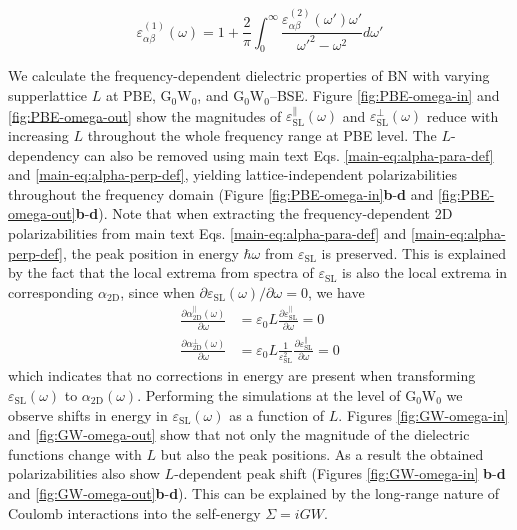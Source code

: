 \documentclass[manuscript=suppinfo,email=true,hyperref=true,keywords=false]{achemso}
\begin{document}
\begin{equation}
  \varepsilon_{\alpha\beta}^{(1)}(\omega)=1+\frac{2}{\pi}\int_0^\infty\frac{\varepsilon_{\alpha\beta}^{(2)}(\omega')\omega'}{\omega'^2-\omega^2}d\omega'
\end{equation}

We calculate the frequency-dependent dielectric properties of BN with
varying supperlattice $L$ at PBE, G$_{0}$W$_{0}$, and G$_{0}$W$_{0}$--BSE. 
Figure \ref{fig:PBE-omega-in} and \ref{fig:PBE-omega-out} show the
magnitudes of $\varepsilon_{\mathrm{SL}}^{\parallel}(\omega)$ and
$\varepsilon_{\mathrm{SL}}^{\perp}(\omega)$ reduce with increasing $L$
throughout the whole frequency range at PBE level. The $L$-dependency can also be
removed using main text Eqs. \ref{main-eq:alpha-para-def} and
\ref{main-eq:alpha-perp-def}, yielding lattice-independent
polarizabilities throughout the frequency domain (Figure \ref{fig:PBE-omega-in}{\bf b}-{\bf d} and \ref{fig:PBE-omega-out}{\bf b}-{\bf d}). 
%
Note that when extracting the frequency-dependent 2D polarizabilities
from main text Eqs. \ref{main-eq:alpha-para-def} and
\ref{main-eq:alpha-perp-def}, the peak position in energy
$\hbar \omega$ from $\varepsilon_{\mathrm{SL}}$ is preserved. This is
explained by the fact that the local extrema from spectra of
$\varepsilon_{\mathrm{SL}}$ is also the local extrema in corresponding
$\alpha_{\mathrm{2D}}$, since when
$\partial \varepsilon_{\mathrm{SL}}(\omega) / \partial \omega = 0 $,
we have
\begin{subequations}
\begin{eqnarray}
  \label{eq:extrema-para}
  \frac{\partial \alpha_{\mathrm{2D}}^{\parallel}(\omega)}{\partial \omega}
  &= \varepsilon_{0}L {\displaystyle \frac{\partial \varepsilon_{\mathrm{SL}}^{\parallel}}{\partial \omega}} = 0   \\
  \label{eq:extrema-perp}
  \frac{\partial \alpha_{\mathrm{2D}}^{\perp}(\omega)}{\partial \omega}
  &= \varepsilon_{0}L {\displaystyle \frac{1}{\varepsilon_{\mathrm{SL}}^{2}}\frac{\partial \varepsilon_{\mathrm{SL}}^{\parallel}}{\partial \omega}} = 0
\end{eqnarray}
\end{subequations}
which indicates that no corrections in energy are present 
when transforming
$\varepsilon_{\mathrm{SL}}(\omega)$ to $\alpha_{\mathrm{2D}}(\omega)$.
Performing the simulations at the level of G$_{0}$W$_{0}$
we observe shifts in energy in $\varepsilon_{\mathrm{SL}}(\omega)$ 
as a function of $L$. Figures \ref{fig:GW-omega-in} and
\ref{fig:GW-omega-out} show that not only the magnitude of the dielectric
functions change with $L$ but also the peak positions. As a result
the obtained polarizabilities also show $L$-dependent peak 
shift (Figures \ref{fig:GW-omega-in} {\bf b}-{\bf d} and
\ref{fig:GW-omega-out}{\bf b}-{\bf d}). This
can be explained by the long-range nature of Coulomb interactions into the self-energy 
$\Sigma=iGW$. 
\end{document}
